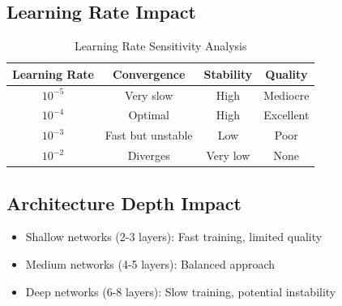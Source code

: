 \documentclass[12pt,a4paper]{article}
\begin{document}
\subsection{Learning Rate Impact}
\begin{table}[H]
    \centering
    \begin{tabular}{|c|c|c|c|}
        \hline
        \textbf{Learning Rate} & \textbf{Convergence} & \textbf{Stability} & \textbf{Quality} \\
        \hline
        $10^{-5}$ & Very slow & High & Mediocre \\
        \hline
        $10^{-4}$ & Optimal & High & Excellent \\
        \hline
        $10^{-3}$ & Fast but unstable & Low & Poor \\
        \hline
        $10^{-2}$ & Diverges & Very low & None \\
        \hline
    \end{tabular}
    \caption{Learning Rate Sensitivity Analysis}
\end{table}

\subsection{Architecture Depth Impact}
\begin{itemize}
    \item Shallow networks (2-3 layers): Fast training, limited quality
    \item Medium networks (4-5 layers): Balanced approach
    \item Deep networks (6-8 layers): Slow training, potential instability
\end{itemize}
\end{document}

